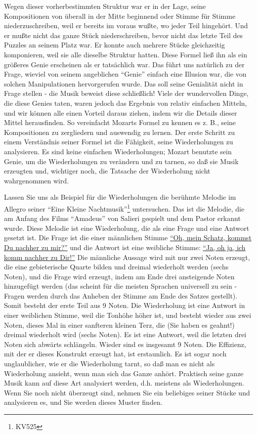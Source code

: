 Wegen dieser vorherbestimmten Struktur war er in der Lage, seine Kompositionen von überall in der Mitte beginnend oder Stimme für Stimme niederzuschreiben, weil er bereits im voraus wußte, wo jeder Teil hingehört.
Und er mußte nicht das ganze Stück niederschreiben, bevor nicht das letzte Teil des Puzzles an seinem Platz war.
Er konnte auch mehrere Stücke gleichzeitig komponieren, weil sie alle dieselbe Struktur hatten.
Diese Formel ließ ihn als ein größeres Genie erscheinen als er tatsächlich war.
Das führt uns natürlich zu der Frage, wieviel von seinem angeblichen \enquote{Genie} einfach eine Illusion war, die von solchen Manipulationen hervorgerufen wurde.
Das soll seine Genialität nicht in Frage stellen - die Musik beweist diese schließlich!
Viele der wundervollen Dinge, die diese Genies taten, waren jedoch das Ergebnis von relativ einfachen Mitteln, und wir können alle einen Vorteil daraus ziehen, indem wir die Details dieser Mittel herausfinden.
So vereinfacht Mozarts Formel zu kennen es z. B., seine Kompositionen zu zergliedern und auswendig zu lernen.
Der erste Schritt zu einem Verständnis seiner Formel ist die Fähigkeit, seine Wiederholungen zu analysieren.
Es sind keine einfachen Wiederholungen; Mozart benutzte sein Genie, um die Wiederholungen zu verändern und zu tarnen, so daß sie Musik erzeugten und, wichtiger noch, die Tatsache der Wiederholung nicht wahrgenommen wird.


\label{KV525}

Lassen Sie uns als Beispiel für die Wiederholungen die berühmte Melodie im Allegro seiner \enquote{Eine Kleine Nachtmusik}\footnote{KV525} untersuchen.
Das ist die Melodie, die am Anfang des Films \enquote{Amadeus} von Salieri gespielt und dem Pastor erkannt wurde.
Diese Melodie ist eine Wiederholung, die als eine Frage und eine Antwort gesetzt ist.
Die Frage ist die einer männlichen Stimme \hyperref[ueb-KV525]{\enquote{Oh, mein Schatz, kommst Du nachher zu mir?}} und die Antwort ist eine weibliche Stimme: \hyperref[ueb-KV525]{\enquote{Ja, oh ja, ich komm nachher zu Dir!}}
Die männliche Aussage wird mit nur zwei Noten erzeugt, die eine gebieterische Quarte bilden und dreimal wiederholt werden (sechs Noten), und die Frage wird erzeugt, indem am Ende drei ansteigende Noten hinzugefügt werden (das scheint für die meisten Sprachen universell zu sein - Fragen werden durch das Anheben der Stimme am Ende des Satzes gestellt).
Somit besteht der erste Teil aus 9 Noten.
Die Wiederholung ist eine Antwort in einer weiblichen Stimme, weil die Tonhöhe höher ist, und besteht wieder aus zwei Noten, dieses Mal in einer sanfteren kleinen Terz, die (Sie haben es geahnt!) dreimal wiederholt wird (sechs Noten).
Es ist eine Antwort, weil die letzten drei Noten sich abwärts schlängeln.
Wieder sind es insgesamt 9 Noten.
Die Effizienz, mit der er dieses Konstrukt erzeugt hat, ist erstaunlich.
Es ist sogar noch unglaublicher, wie er die Wiederholung tarnt, so daß man es nicht als Wiederholung ansieht, wenn man sich das Ganze anhört.
Praktisch seine ganze Musik kann auf diese Art analysiert werden, d.h. meistens als Wiederholungen.
Wenn Sie noch nicht überzeugt sind, nehmen Sie ein beliebiges seiner Stücke und analysieren es, und Sie werden dieses Muster finden.

